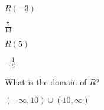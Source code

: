\begin{exercises}
\begin{problem}
\begin{multicols}{4}
\begin{subproblem}
    \end{subproblem}
    \begin{subproblem}
   $R(-3)$ 
        \begin{shortsolution}
         $\frac{7}{13}$ 
        \end{shortsolution}
    \end{subproblem}
    \begin{subproblem}
    $R(5)$ 
        \begin{shortsolution}
         $-\frac{1}{5}$ 
        \end{shortsolution}
    \end{subproblem}
\end{multicols}
    \begin{subproblem}
   What is the domain of $R$? 
        \begin{shortsolution}
        $(-\infty,10)\cup(10,\infty)$ 
        \end{shortsolution}
    \end{subproblem}
\end{problem}
\end{exercises}

